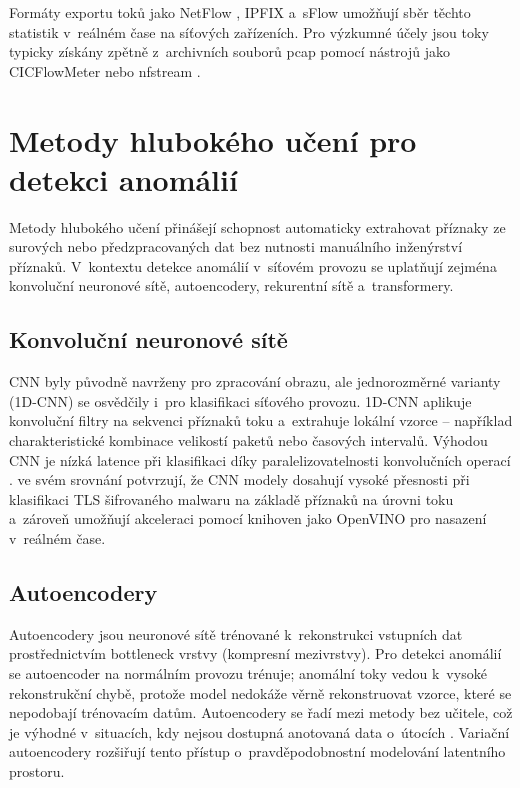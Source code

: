 Formáty exportu toků jako NetFlow \parencite{CiscoNetFlow}, IPFIX \parencite{RFC7011} a~sFlow \parencite{sFlowDatagram} umožňují sběr těchto statistik v~reálném čase na síťových zařízeních. Pro výzkumné účely jsou toky typicky získány zpětně z~archivních souborů pcap pomocí nástrojů jako CICFlowMeter nebo nfstream \parencite{Ferriyan2021}.

\section{Metody hlubokého učení pro detekci anomálií}
\label{sec:metody-dl}

Metody hlubokého učení přinášejí schopnost automaticky extrahovat příznaky ze surových nebo předzpracovaných dat bez nutnosti manuálního inženýrství příznaků. V~kontextu detekce anomálií v~síťovém provozu se uplatňují zejména konvoluční neuronové sítě, autoencodery, rekurentní sítě a~transformery.

\subsection{Konvoluční neuronové sítě}
\label{sec:nn-dl}

CNN byly původně navrženy pro zpracování obrazu, ale jednorozměrné varianty (1D-CNN) se osvědčily i~pro klasifikaci síťového provozu. 1D-CNN aplikuje konvoluční filtry na sekvenci příznaků toku a~extrahuje lokální vzorce -- například charakteristické kombinace velikostí paketů nebo časových intervalů. Výhodou CNN je nízká latence při klasifikaci díky paralelizovatelnosti konvolučních operací \parencite{Bakhshi2021}. \textcite{Barut2020} ve svém srovnání potvrzují, že CNN modely dosahují vysoké přesnosti při klasifikaci TLS šifrovaného malwaru na základě příznaků na úrovni toku a~zároveň umožňují akceleraci pomocí knihoven jako OpenVINO \parencite{IntelOpenVINO} pro nasazení v~reálném čase.

\subsection{Autoencodery}
\label{sec:autoencodery}

Autoencodery jsou neuronové sítě trénované k~rekonstrukci vstupních dat prostřednictvím bottleneck vrstvy (kompresní mezivrstvy). Pro detekci anomálií se autoencoder na normálním provozu trénuje; anomální toky vedou k~vysoké rekonstrukční chybě, protože model nedokáže věrně rekonstruovat vzorce, které se nepodobají trénovacím datům. Autoencodery se řadí mezi metody bez učitele, což je výhodné v~situacích, kdy nejsou dostupná anotovaná data o~útocích \parencite{Ji2024}. Variační autoencodery \parencite{Kingma2014} rozšiřují tento přístup o~pravděpodobnostní modelování latentního prostoru.

